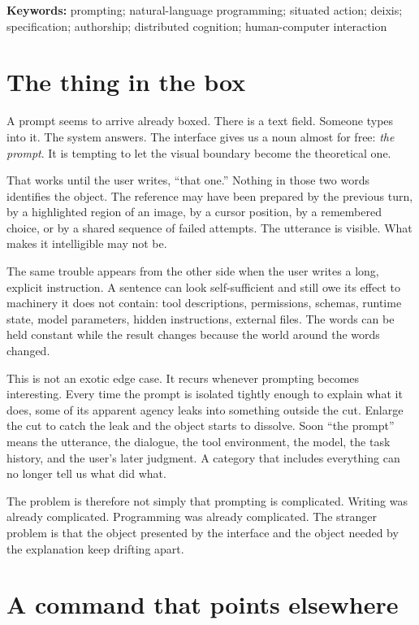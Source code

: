 \documentclass[11pt]{article}
\begin{document}
\textbf{Keywords:} prompting; natural-language programming; situated action; deixis; specification; authorship; distributed cognition; human-computer interaction

\section{The thing in the box}

A prompt seems to arrive already boxed. There is a text field. Someone types into it. The system answers. The interface gives us a noun almost for free: \emph{the prompt}. It is tempting to let the visual boundary become the theoretical one.

That works until the user writes, ``that one.'' Nothing in those two words identifies the object. The reference may have been prepared by the previous turn, by a highlighted region of an image, by a cursor position, by a remembered choice, or by a shared sequence of failed attempts. The utterance is visible. What makes it intelligible may not be.

The same trouble appears from the other side when the user writes a long, explicit instruction. A sentence can look self-sufficient and still owe its effect to machinery it does not contain: tool descriptions, permissions, schemas, runtime state, model parameters, hidden instructions, external files. The words can be held constant while the result changes because the world around the words changed.

This is not an exotic edge case. It recurs whenever prompting becomes interesting. Every time the prompt is isolated tightly enough to explain what it does, some of its apparent agency leaks into something outside the cut. Enlarge the cut to catch the leak and the object starts to dissolve. Soon ``the prompt'' means the utterance, the dialogue, the tool environment, the model, the task history, and the user's later judgment. A category that includes everything can no longer tell us what did what.

The problem is therefore not simply that prompting is complicated. Writing was already complicated. Programming was already complicated. The stranger problem is that the object presented by the interface and the object needed by the explanation keep drifting apart.

\section{A command that points elsewhere}
\end{document}
